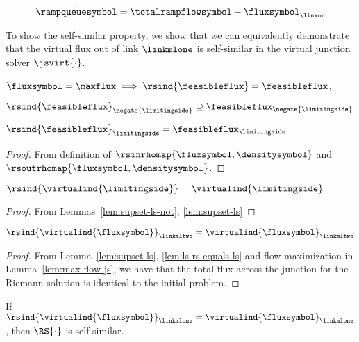 \[
\dot{\rampqueuesymbol}=\totalrampflowsymbol-\fluxsymbol_{\linkon}
\]


To show the self-similar property, we show that we can equivalently
demonstrate that the virtual flux out of link $\linkmlone$ is self-similar
in the virtual junction solver $\jsvirt{\cdot}$. 
\begin{lem}
\label{lem:maxed-flux}$\fluxsymbol=\maxflux\implies\rsind{\feasibleflux}=\feasibleflux$, 
\end{lem}

\begin{lem}
\label{lem:supset-ls-not}$\rsind{\feasibleflux}_{\negate{\limitingside}}\supseteq\feasibleflux_{\negate{\limitingside}}$
\end{lem}

\begin{lem}
\label{lem:supset-ls}$\rsind{\feasibleflux}_{\limitingside}=\feasibleflux_{\limitingside}$\end{lem}
\begin{proof}
From definition of $\rsinrhomap{\fluxsymbol,\densitysymbol}$ and
$\rsoutrhomap{\fluxsymbol,\densitysymbol}$.\end{proof}
\begin{lem}
\label{lem:ls-rs-equals-ls}$\rsind{\virtualind{\limitingside}}=\virtualind{\limitingside}$\end{lem}
\begin{proof}
From Lemmas~\ref{lem:supset-ls-not}, \ref{lem:supset-ls}\end{proof}
\begin{lem}
$\rsind{\virtualind{\fluxsymbol}}_{\linkmltwo}=\virtualind{\fluxsymbol}_{\linkmltwo}$\label{lem:equal-flux-two}\end{lem}
\begin{proof}
From Lemma~\ref{lem:supset-ls}, \ref{lem:ls-rs-equals-ls} and
flow maximization in Lemma~\ref{lem:max-flow-js}, we have that the
total flux across the junction for the Riemann solution is identical
to the initial problem.\end{proof}
\begin{lem}
\label{lem:match-flux-virtual}If \textup{$\rsind{\virtualind{\fluxsymbol}}_{\linkmlone}=\virtualind{\fluxsymbol}_{\linkmlone}$,
then $\RS{\cdot}$ is self-similar.}\end{lem}
